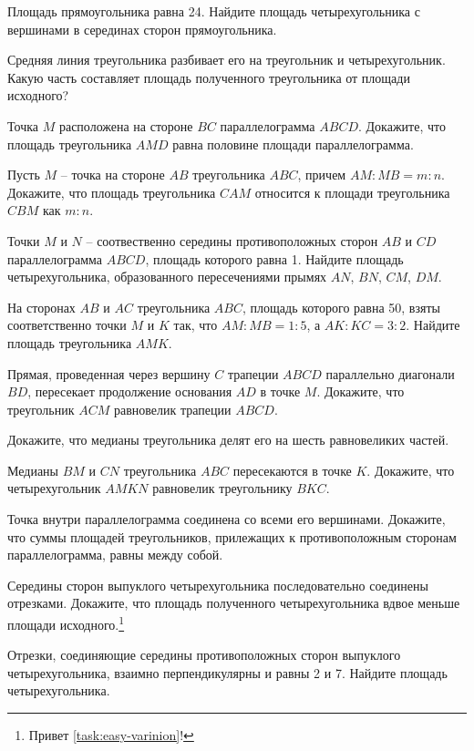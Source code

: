 
\begin{tasks}
    \item\label{task:easy-varinion} Площадь прямоугольника равна 24. Найдите площадь четырехугольника с вершинами в серединах сторон прямоугольника.
    \item Средняя линия треугольника разбивает его на треугольник и четырехугольник. Какую часть составляет площадь полученного треугольника от площади исходного?
    \item Точка $M$ расположена на стороне $BC$ параллелограмма $ABCD$. Докажите, что площадь треугольника $AMD$ равна половине площади параллелограмма.
    \item Пусть $M$ -- точка на стороне $AB$ треугольника $ABC$, причем $AM : MB = m : n$. Докажите, что площадь треугольника $CAM$ относится к площади треугольника $CBM$ как $m : n$.
    \item Точки $M$ и $N$ -- соотвественно середины противоположных сторон $AB$ и $CD$ параллелограмма $ABCD$, площадь которого равна 1. Найдите площадь четырехугольника, образованного пересечениями прымях $AN$, $BN$, $CM$, $DM$.
    \item На сторонах $AB$ и $AC$ треугольника $ABC$, площадь которого равна 50, взяты соответственно точки $M$ и $K$ так, что $AM : MB = 1 : 5$, а $AK : KC = 3 : 2$. Найдите площадь треугольника $AMK$.
    \item Прямая, проведенная через вершину $C$ трапеции $ABCD$ параллельно диагонали $BD$, пересекает продолжение основания $AD$ в точке $M$. Докажите, что треугольник $ACM$ равновелик трапеции $ABCD$.
    \item Докажите, что медианы треугольника делят его на шесть равновеликих частей.
    \item Медианы $BM$ и $CN$ треугольника $ABC$ пересекаются в точке $K$. Докажите, что четырехугольник $AMKN$ равновелик треугольнику $BKC$.
    \item Точка внутри параллелограмма соединена со всеми его вершинами. Докажите, что суммы площадей треугольников, прилежащих к противоположным сторонам параллелограмма, равны между собой.
    \item Середины сторон выпуклого четырехугольника последовательно соединены отрезками. Докажите, что площадь полученного четырехугольника вдвое меньше площади исходного.\footnote{Привет \cref{task:easy-varinion}!}
    \item Отрезки, соединяющие середины противоположных сторон выпуклого четырехугольника, взаимно перпендикулярны и равны 2 и 7. Найдите площадь четырехугольника.

\end{tasks}
